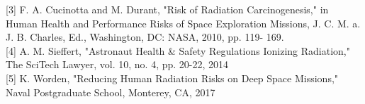 \documentclass[12pt,a4paper]{article}
\begin{document}
{[3]} F. A. Cucinotta and M. Durant, "Risk of Radiation
Carcinogenesis," in Human Health and Performance
Risks of Space Exploration Missions, J. C. M. a. J. B.
Charles, Ed., Washington, DC: NASA, 2010, pp. 119-
169. \\

{[4]} A. M. Sieffert, "Astronaut Health \& Safety Regulations
Ionizing Radiation," The SciTech Lawyer, vol. 10, no.
4, pp. 20-22, 2014 \\

{[5]} K. Worden, "Reducing Human Radiation Risks on
Deep Space Missions," Naval Postgraduate School,
Monterey, CA, 2017 \\
\end{document}
